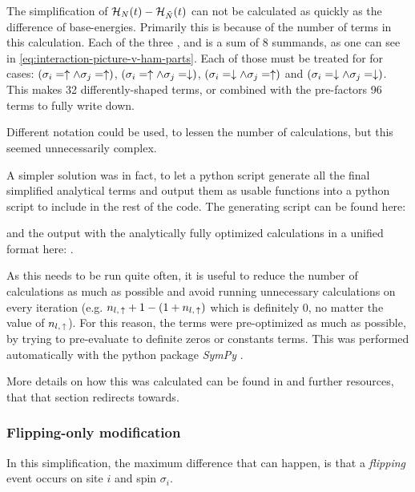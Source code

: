 The simplification of $\HNOft - \HNOft[\tilde{N}]$ can not be calculated as quickly as the difference of base-energies.
Primarily this is because of the number of terms in this calculation. Each of the three ,  and  is a sum of 8 summands, as one can see in \autoref{eq:interaction-picture-v-ham-parts}.
Each of those must be treated for for cases: $(\sigma_i = \up \land \sigma_j = \up)$, $(\sigma_i = \up \land \sigma_j = \down)$, $(\sigma_i = \down \land \sigma_j = \up)$ and $(\sigma_i = \down \land \sigma_j = \down)$.
This makes 32 differently-shaped terms, or combined with the pre-factors 96 terms to fully write down.

Different notation could be used, to lessen the number of calculations, but this seemed unnecessarily complex.

A simpler solution was in fact, to let a python script generate all the final simplified analytical terms and output them as usable functions into a python script to include in the rest of the code.
The generating script can be found here: 


and the output with the analytically fully optimized calculations in a unified format here:
.

As this needs to be run quite often, it is useful to reduce the number of calculations as much as possible and avoid running unnecessary calculations on every iteration (e.g. $n_{l,\,\up} + 1 - (1 + n_{l,\,\up})$ which is definitely 0, no matter the value of $n_{l,\,\up}$).
For this reason, the terms were pre-optimized as much as possible, by trying to pre-evaluate to definite zeros or constants terms. 
This was performed automatically with the python package \emph{SymPy} \cite{sympyPackage}.

More details on how this was calculated can be found in  and further resources, that that section redirects towards.

\subsubsection*{Flipping-only modification}

In this simplification, the maximum difference that can happen, is that a \emph{flipping} event occurs on site $i$ and spin $\sigma_i$. 

